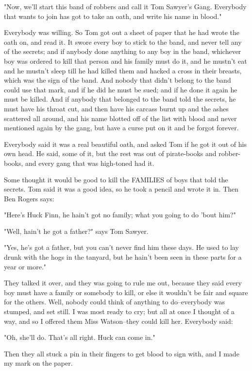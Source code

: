 "Now, we'll start this band of robbers and call it Tom Sawyer's Gang.
Everybody that wants to join has got to take an oath, and write his name
in blood."

Everybody was willing.  So Tom got out a sheet of paper that he had wrote
the oath on, and read it.  It swore every boy to stick to the band, and
never tell any of the secrets; and if anybody done anything to any boy in
the band, whichever boy was ordered to kill that person and his family
must do it, and he mustn't eat and he mustn't sleep till he had killed
them and hacked a cross in their breasts, which was the sign of the band.
And nobody that didn't belong to the band could use that mark, and if he
did he must be sued; and if he done it again he must be killed.  And if
anybody that belonged to the band told the secrets, he must have his
throat cut, and then have his carcass burnt up and the ashes scattered
all around, and his name blotted off of the list with blood and never
mentioned again by the gang, but have a curse put on it and be forgot
forever.

Everybody said it was a real beautiful oath, and asked Tom if he got it
out of his own head.  He said, some of it, but the rest was out of
pirate-books and robber-books, and every gang that was high-toned had it.

Some thought it would be good to kill the FAMILIES of boys that told the
secrets.  Tom said it was a good idea, so he took a pencil and wrote it
in. Then Ben Rogers says:

"Here's Huck Finn, he hain't got no family; what you going to do 'bout
him?"

"Well, hain't he got a father?" says Tom Sawyer.

"Yes, he's got a father, but you can't never find him these days.  He
used to lay drunk with the hogs in the tanyard, but he hain't been seen
in these parts for a year or more."

They talked it over, and they was going to rule me out, because they said
every boy must have a family or somebody to kill, or else it wouldn't be
fair and square for the others.  Well, nobody could think of anything to
do--everybody was stumped, and set still.  I was most ready to cry; but
all at once I thought of a way, and so I offered them Miss Watson--they
could kill her.  Everybody said:

"Oh, she'll do.  That's all right.  Huck can come in."

Then they all stuck a pin in their fingers to get blood to sign with, and
I made my mark on the paper.

